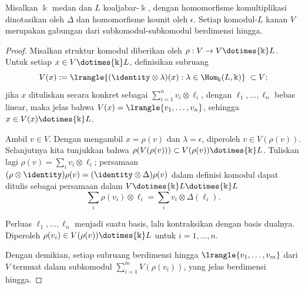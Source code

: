\begin{lemma}\label{prop:comodule-fd-union}
	Misalkan $\Bbbk$ medan dan $L$ koaljabar-$\Bbbk$, dengan homomorfisme
	komultiplikasi dinotasikan oleh $\Delta$ dan homomorfisme kounit oleh
	$\epsilon$. Setiap komodul-$L$ kanan $V$ merupakan gabungan dari
	subkomodul-subkomodul berdimensi hingga.
\end{lemma}
\begin{proof}
	Misalkan struktur komodul diberikan oleh
	$\rho: V \to V \dotimes{\Bbbk} L$. Untuk setiap
	$x \in V \dotimes{\Bbbk} L$, definisikan subruang
	\[ V(x) := \lrangle{(\identity \otimes \lambda)(x) : \lambda \in \Hom_{\Bbbk}(L, \Bbbk) } \; \subset V ; \]
	jika $x$ dituliskan secara konkret sebagai
	$\sum_{i=1}^n v_i \otimes \ell_i$, dengan
	$\ell_1, \ldots, \ell_n$ bebas linear, maka jelas bahwa
	$V(x) = \lrangle{v_1, \ldots, v_n}$, sehingga
	$x \in V(x) \dotimes{\Bbbk} L$.
	
	Ambil $v \in V$. Dengan mengambil $x = \rho(v)$ dan
	$\lambda = \epsilon$, diperoleh $v \in V(\rho(v))$. Selanjutnya kita
	tunjukkan bahwa
	$\rho(V(\rho(v))) \subset V(\rho(v)) \dotimes{\Bbbk} L$. Tuliskan lagi
	$\rho(v) = \sum_i v_i \otimes \ell_i$; persamaan
	$(\rho \otimes \identity)\rho(v) = (\identity \otimes \Delta)\rho(v)$
	dalam definisi komodul dapat ditulis sebagai persamaan dalam
	$V \dotimes{\Bbbk} L \dotimes{\Bbbk} L$
	\[ \sum_i \rho(v_i) \otimes \ell_i = \sum_i v_i \otimes \Delta(\ell_i). \]
	
	Perluas $\ell_1, \ldots, \ell_n$ menjadi suatu basis, lalu kontraksikan
	dengan basis dualnya. Diperoleh
	$\rho(v_i) \in V(\rho(v)) \dotimes{\Bbbk} L$ untuk
	$i = 1, \ldots, n$.
	
	Dengan demikian, setiap subruang berdimensi hingga
	$\lrangle{v_1, \ldots, v_m}$ dari $V$ termuat dalam subkomodul
	$\sum_{i=1}^m V(\rho(v_i))$, yang jelas berdimensi hingga.
\end{proof}

